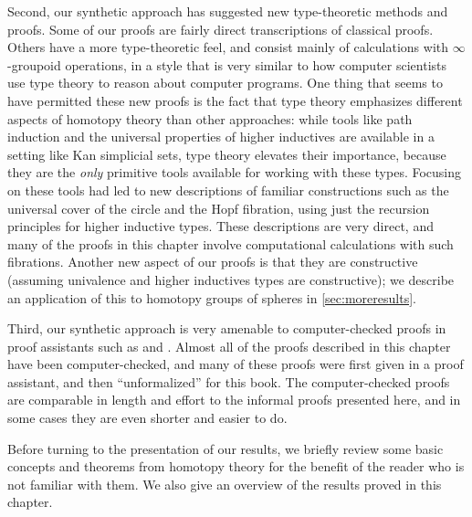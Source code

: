 Second, our synthetic approach has suggested new type-theoretic
methods and proofs.  Some of our proofs are fairly
direct transcriptions of classical proofs.  Others have a more
type-theoretic feel, and consist mainly of calculations with
$\infty$-groupoid operations, in a style that is very similar to how
computer scientists use type theory to reason about computer programs.
One thing that seems to have permitted these new proofs is the fact that type theory
emphasizes different aspects of homotopy theory than other approaches:
while tools like path induction and the universal properties of higher
inductives are available in a setting like Kan simplicial sets, type
theory elevates their importance, because they are the \emph{only}
primitive tools available for working with these types.  Focusing on
these tools had led to new descriptions of familiar constructions such
as the universal cover of the circle and the Hopf fibration, using just the
recursion principles for higher inductive types.  These descriptions are
very direct, and many of the proofs in this chapter involve
computational calculations with such fibrations.
%
Another new aspect of our proofs is that they are constructive (assuming
univalence and higher inductives types are constructive); we describe an
application of this to homotopy groups of spheres in
\cref{sec:moreresults}.

%
%
Third, our synthetic approach is very amenable to computer-checked
proofs in proof assistants such as \Coq and \Agda.
Almost all of the proofs
described in this chapter have been computer-checked, and many of these
proofs were first given in a proof assistant, and then ``unformalized''
for this book.  The computer-checked proofs are comparable in length and
effort to the informal proofs presented here, and in some cases they are
even shorter and easier to do.

\mentalpause

Before turning to the presentation of our results, we briefly review some
 basic concepts and theorems from homotopy theory for the benefit of the reader who is not familiar with them.
 We also give an overview of the
results proved in this chapter.

